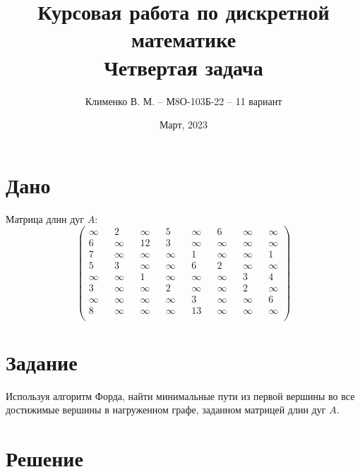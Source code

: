 \documentclass{article}
\title{Курсовая работа по дискретной математике\\Четвертая задача}
\author{Клименко В. М. -- М8О-103Б-22 -- 11 вариант}
\date{Март, 2023}
\begin{document}
\maketitle


\section*{Дано}
Матрица длин дуг $A$:
$$
\begin{pmatrix}
    \infty && 2      && \infty  && 5      && \infty && 6      && \infty && \infty \\
    6      && \infty && 12      && 3      && \infty && \infty && \infty && \infty \\
    7      && \infty && \infty  && \infty && 1      && \infty && \infty && 1      \\
    5      && 3      && \infty  && \infty && 6      && 2      && \infty && \infty \\
    \infty && \infty && 1       && \infty && \infty && \infty && 3      && 4      \\
    3      && \infty && \infty  && 2      && \infty && \infty && 2      && \infty \\
    \infty && \infty && \infty  && \infty && 3      && \infty && \infty && 6      \\
    8      && \infty && \infty  && \infty && 13     && \infty && \infty && \infty \\
\end{pmatrix}
$$


\section*{Задание}
Используя алгоритм Форда, найти минимальные пути из первой вершины во
все достижимые вершины в нагруженном графе, заданном матрицей длин дуг $A$.


\section*{Решение}
\end{document}
